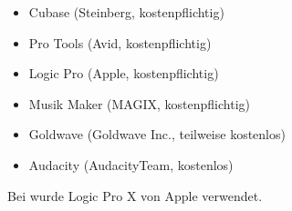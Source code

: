 \begin{itemize}
 \item Cubase (Steinberg, kostenpflichtig)
 \item Pro Tools (Avid, kostenpflichtig)
 \item Logic Pro (Apple, kostenpflichtig)
 \item Musik Maker (MAGIX, kostenpflichtig)
 \item Goldwave (Goldwave Inc., teilweise kostenlos)
 \item Audacity (AudacityTeam, kostenlos)
 \end{itemize} 

Bei \gamename wurde Logic Pro X von Apple verwendet. 

